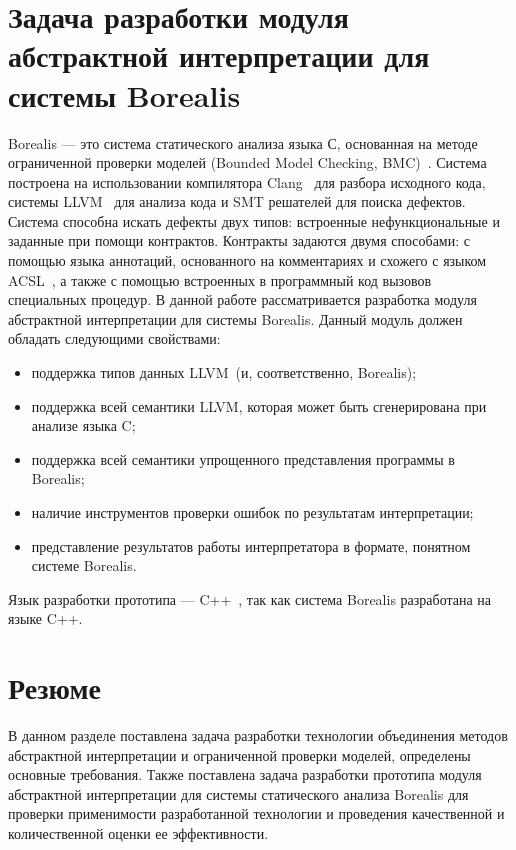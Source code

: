 \section{Задача разработки модуля абстрактной интерпретации для системы 
Borealis}
Borealis --- это система статического анализа языка С, основанная на методе 
ограниченной проверки моделей (Bounded Model Checking, BMC)~\cite{borealis}. Система 
построена на использовании компилятора Clang~\cite{clang} для разбора исходного 
кода, системы LLVM~\cite{llvm} для анализа кода и SMT решателей для поиска 
дефектов. Система способна искать дефекты двух типов: встроенные 
нефункциональные и заданные при помощи контрактов. Контракты задаются двумя 
способами: с помощью языка аннотаций, основанного на комментариях и схожего с 
языком ACSL~\cite{acsl}, а также с помощью встроенных в программный код вызовов специальных 
процедур. В данной работе рассматривается разработка модуля абстрактной 
интерпретации для системы Borealis. Данный модуль должен обладать следующими
свойствами:
\begin{itemize}
\item поддержка типов данных LLVM~(и, соответственно, Borealis);
\item поддержка всей семантики LLVM, которая может быть сгенерирована при 
анализе языка C;
\item поддержка всей семантики упрощенного представления программы в Borealis;
\item наличие инструментов проверки ошибок по результатам интерпретации;
\item представление результатов работы интерпретатора в формате, понятном 
системе Borealis.
\end{itemize}

Язык разработки прототипа --- C++~\cite{languageC++}, так как система Borealis 
разработана на языке C++.

\section{Резюме}
В данном разделе поставлена задача разработки технологии объединения методов
абстрактной интерпретации и ограниченной проверки моделей, определены основные 
требования. Также поставлена задача разработки прототипа модуля абстрактной
интерпретации для системы статического анализа Borealis для проверки 
применимости разработанной технологии и проведения качественной и 
количественной оценки ее эффективности.